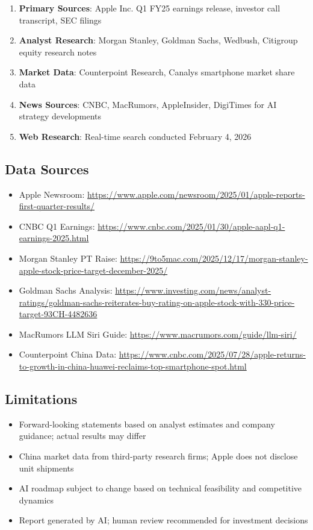 \documentclass[11pt,a4paper]{article}
\begin{document}
\begin{enumerate}
    \item \textbf{Primary Sources}: Apple Inc. Q1 FY25 earnings release, investor call transcript, SEC filings
    \item \textbf{Analyst Research}: Morgan Stanley, Goldman Sachs, Wedbush, Citigroup equity research notes
    \item \textbf{Market Data}: Counterpoint Research, Canalys smartphone market share data
    \item \textbf{News Sources}: CNBC, MacRumors, AppleInsider, DigiTimes for AI strategy developments
    \item \textbf{Web Research}: Real-time search conducted February 4, 2026
\end{enumerate}

\subsection{Data Sources}

\begin{itemize}
    \item Apple Newsroom: \url{https://www.apple.com/newsroom/2025/01/apple-reports-first-quarter-results/}
    \item CNBC Q1 Earnings: \url{https://www.cnbc.com/2025/01/30/apple-aapl-q1-earnings-2025.html}
    \item Morgan Stanley PT Raise: \url{https://9to5mac.com/2025/12/17/morgan-stanley-apple-stock-price-target-december-2025/}
    \item Goldman Sachs Analysis: \url{https://www.investing.com/news/analyst-ratings/goldman-sachs-reiterates-buy-rating-on-apple-stock-with-330-price-target-93CH-4482636}
    \item MacRumors LLM Siri Guide: \url{https://www.macrumors.com/guide/llm-siri/}
    \item Counterpoint China Data: \url{https://www.cnbc.com/2025/07/28/apple-returns-to-growth-in-china-huawei-reclaims-top-smartphone-spot.html}
\end{itemize}

\subsection{Limitations}

\begin{itemize}
    \item Forward-looking statements based on analyst estimates and company guidance; actual results may differ
    \item China market data from third-party research firms; Apple does not disclose unit shipments
    \item AI roadmap subject to change based on technical feasibility and competitive dynamics
    \item Report generated by AI; human review recommended for investment decisions
\end{itemize}
\end{document}
